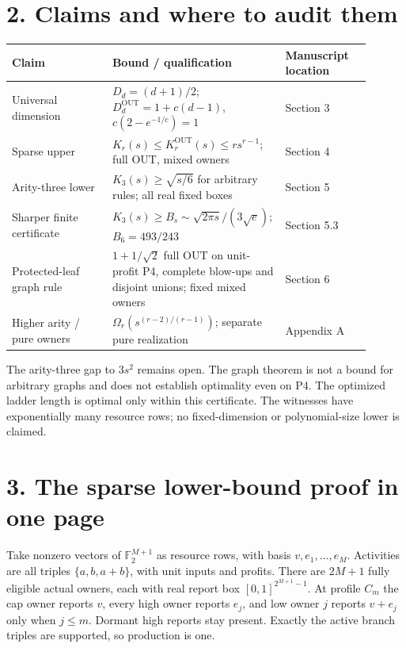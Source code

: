 \documentclass[11pt]{article}
\begin{document}
\section*{2. Claims and where to audit them}
\begin{center}\small
\begin{tabular}{p{0.27\linewidth}p{0.40\linewidth}p{0.23\linewidth}}
\toprule
Claim & Bound / qualification & Manuscript location\\\midrule
Universal dimension & $D_d=(d+1)/2$; $D_d^{\mathrm{OUT}}=1+c(d-1)$,
$c(2-e^{-1/c})=1$ & Section 3\\[3pt]
Sparse upper & $K_r(s)\le K_r^{\mathrm{OUT}}(s)\le rs^{r-1}$;
full OUT, mixed owners & Section 4\\[3pt]
Arity-three lower & $K_3(s)\ge\sqrt{s/6}$ for arbitrary rules;
all real fixed boxes & Section 5\\[3pt]
Sharper finite certificate & $K_3(s)\ge B_s\sim\sqrt{2\pi s}/(3\sqrt e)$;
$B_6=493/243$ & Section 5.3\\[3pt]
Protected-leaf graph rule & $1+1/\sqrt2$ full OUT on unit-profit P4,
complete blow-ups and disjoint unions; fixed mixed owners & Section 6\\[3pt]
Higher arity / pure owners & $\Omega_r(s^{(r-2)/(r-1)})$;
separate pure realization & Appendix A\\\bottomrule
\end{tabular}
\end{center}
The arity-three gap to $3s^2$ remains open. The graph theorem is not a bound
for arbitrary graphs and does not establish optimality even on P4. The optimized ladder length is
optimal only within this certificate. The witnesses have exponentially many
resource rows; no fixed-dimension or polynomial-size lower is claimed.

\section*{3. The sparse lower-bound proof in one page}
Take nonzero vectors of $\mathbb F_2^{M+1}$ as resource rows, with basis
$v,e_1,\ldots,e_M$. Activities are all triples $\{a,b,a+b\}$, with unit
inputs and profits. There are $2M+1$ fully eligible actual owners, each with
real report box $[0,1]^{2^{M+1}-1}$. At profile $C_m$ the cap owner reports
$v$, every high owner reports $e_j$, and low owner $j$ reports $v+e_j$ only
when $j\le m$. Dormant high reports stay present. Exactly the active branch
triples are supported, so production is one.
\end{document}
